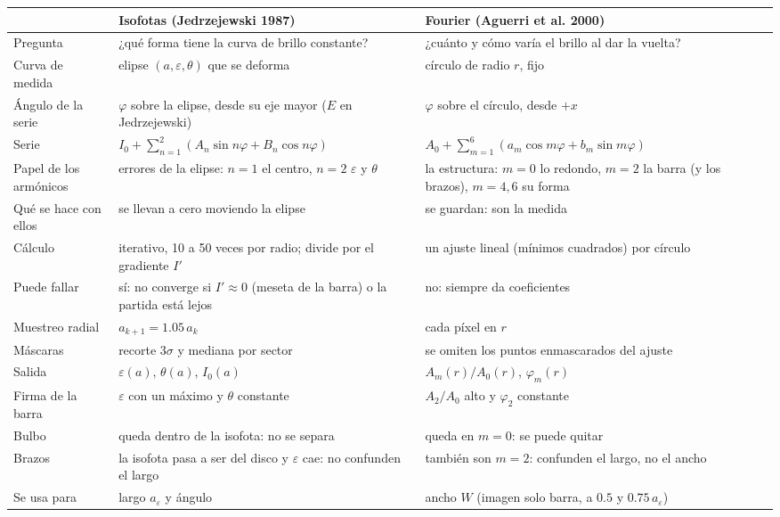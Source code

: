 \documentclass[11pt,a4paper]{article}
\newcommand{\aeps}{a_\varepsilon}
\begin{document}
\begin{center}
\small
\begin{tabularx}{\textwidth}{>{\raggedright\arraybackslash}p{3.1cm}XX}
\toprule
 & Isofotas (Jedrzejewski 1987) & Fourier (Aguerri et al. 2000) \\
\midrule
Pregunta & ¿qué forma tiene la curva de brillo constante? & ¿cuánto y cómo varía el brillo al dar la vuelta? \\
Curva de medida & elipse $(a, \varepsilon, \theta)$ que se deforma & círculo de radio $r$, fijo \\
Ángulo de la serie & $\varphi$ sobre la elipse, desde su eje mayor ($E$ en Jedrzejewski) & $\varphi$ sobre el círculo, desde $+x$ \\
Serie & $I_0 + \sum_{n=1}^{2}(A_n\sin n\varphi + B_n\cos n\varphi)$ & $A_0 + \sum_{m=1}^{6}(a_m\cos m\varphi + b_m\sin m\varphi)$ \\
Papel de los armónicos & errores de la elipse: $n = 1$ el centro, $n = 2$ $\varepsilon$ y $\theta$ & la estructura: $m = 0$ lo redondo, $m = 2$ la barra (y los brazos), $m = 4, 6$ su forma \\
Qué se hace con ellos & se llevan a cero moviendo la elipse & se guardan: son la medida \\
Cálculo & iterativo, 10 a 50 veces por radio; divide por el gradiente $I'$ & un ajuste lineal (mínimos cuadrados) por círculo \\
Puede fallar & sí: no converge si $I' \approx 0$ (meseta de la barra) o la partida está lejos & no: siempre da coeficientes \\
Muestreo radial & $a_{k+1} = 1.05\,a_k$ & cada píxel en $r$ \\
Máscaras & recorte $3\sigma$ y mediana por sector & se omiten los puntos enmascarados del ajuste \\
Salida & $\varepsilon(a)$, $\theta(a)$, $I_0(a)$ & $A_m(r)/A_0(r)$, $\varphi_m(r)$ \\
Firma de la barra & $\varepsilon$ con un máximo y $\theta$ constante & $A_2/A_0$ alto y $\varphi_2$ constante \\
Bulbo & queda dentro de la isofota: no se separa & queda en $m = 0$: se puede quitar \\
Brazos & la isofota pasa a ser del disco y $\varepsilon$ cae: no confunden el largo & también son $m = 2$: confunden el largo, no el ancho \\
Se usa para & largo $\aeps$ y ángulo & ancho $W$ (imagen solo barra, a $0.5$ y $0.75\,\aeps$) \\
\bottomrule
\end{tabularx}
\end{center}
\end{document}

